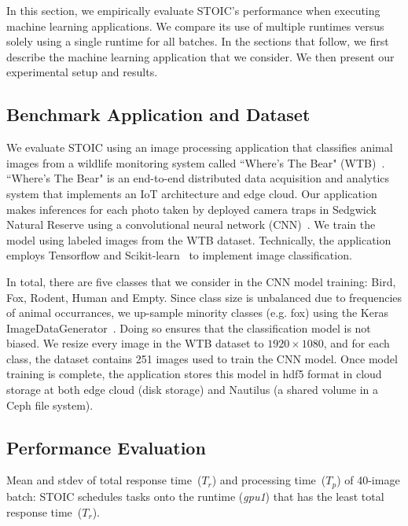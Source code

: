 In this section, we empirically evaluate STOIC's performance when executing machine learning applications. We compare its use of multiple runtimes
versus solely using a single runtime for all batches.  In the sections
that follow, we first describe 
the machine learning application that we consider. We then
present our experimental setup and results. 

\subsection{Benchmark Application and Dataset}

We evaluate STOIC using an image processing application that classifies animal images from a wildlife monitoring system called ``Where's The Bear" (WTB)~\cite{ref:wtb}. ``Where's The Bear" is an end-to-end distributed data acquisition and analytics system that implements an IoT architecture and edge cloud. Our application makes inferences for each photo taken by deployed camera traps in Sedgwick Natural Reserve using a convolutional neural network (CNN)~\cite{ref:cnn}.  We train the model using labeled images from the WTB dataset. Technically, the application employs Tensorflow and Scikit-learn~\cite{ref:scikit} to implement 
image classification.  

In total, there are five classes that we consider in the CNN model training: Bird, Fox, Rodent, Human and Empty. Since class size is unbalanced due to frequencies of animal occurrances, we up-sample minority classes (e.g. fox) using 
the Keras ImageDataGenerator~\cite{ref:keras}.  Doing so ensures that the classification model is not biased. We resize every image in the WTB dataset to $1920 \times 1080$, and for each class, the dataset contains 251 images used to train the CNN model. Once model training is complete, the application stores this model in hdf5 format in cloud storage at both edge cloud (disk storage) and Nautilus (a shared volume in a Ceph file system).

\subsection{Performance Evaluation}

\begin{table}[t] \centering 

\caption{Mean and stdev of total response time~($T_r$) and processing time~($T_p$) of 40-image batch: STOIC schedules tasks onto the runtime (\textit{gpu1}) that has the least total response time~($T_r$).
\label{tab:validation}}
\end{table}

